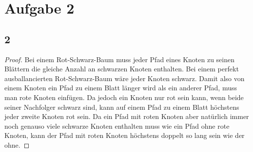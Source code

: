 \documentclass[a4paper, 11pt]{article}
\begin{document}
\section*{Aufgabe 2}

\subsection*{2}
\begin{proof}
    Bei einem Rot-Schwarz-Baum muss jeder Pfad eines Knoten zu seinen Blättern die gleiche Anzahl an schwarzen Knoten enthalten.
    Bei einem perfekt ausballancierten Rot-Schwarz-Baum wäre jeder Knoten schwarz.
    Damit also von einem Knoten ein Pfad zu einem Blatt länger wird als ein anderer Pfad, muss man rote Knoten einfügen.
    Da jedoch ein Knoten nur rot sein kann, wenn beide seiner Nachfolger schwarz sind, kann auf einem Pfad zu einem Blatt höchstens jeder zweite Knoten rot sein.
    Da ein Pfad mit roten Knoten aber natürlich immer noch genauso viele schwarze Knoten enthalten muss wie ein Pfad ohne rote Knoten, kann der Pfad mit roten Knoten höchstens doppelt so lang sein wie der ohne.
\end{proof}
\end{document}

